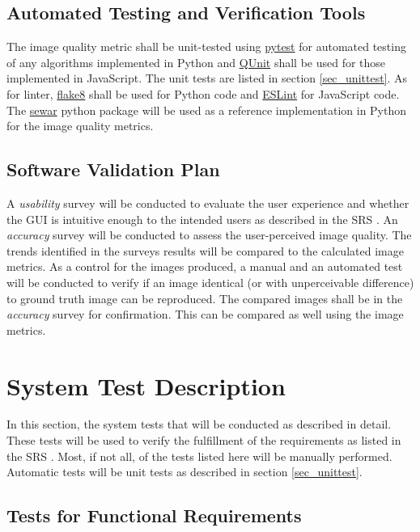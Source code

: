 \documentclass[12pt, titlepage]{article}
\begin{document}
\subsection{Automated Testing and Verification Tools} \label{sec_autotest_tools}

The image quality metric shall be unit-tested using \href{https://pytest.org}{pytest} for 
automated testing of any algorithms implemented in Python and \href{https://qunitjs.com}{QUnit} 
shall be used for those implemented in JavaScript. The unit tests are listed in 
section \ref{sec_unittest}.
As for linter, \href{https://flake8.pycqa.org}{flake8} shall be used for Python code 
and \href{https://eslint.org}{ESLint} for JavaScript code.
The \href{https://github.com/andrewekhalel/sewar}{sewar} python package will be 
used as a reference implementation in Python for the image quality metrics.


\subsection{Software Validation Plan}
A \textit{usability} survey will be conducted to evaluate the user experience and whether 
the GUI is intuitive enough to the intended users as described in the SRS \citep{SRS}.
An \textit{accuracy} survey will be conducted to assess the user-perceived image quality. 
The trends identified in the surveys results will be compared to the calculated image metrics.
As a control for the images produced, a manual and an automated test will be conducted to verify if 
an image identical (or with unperceivable difference) to ground truth image can be reproduced.
The compared images shall be in the \textit{accuracy} survey for confirmation. This can be compared
as well using the image metrics. 


\section{System Test Description}

In this section, the system tests that will be conducted as described in detail. These tests
will be used to verify the fulfillment of the requirements as listed in the SRS \citep{SRS}.
Most, if not all, of the tests listed here will be manually performed. Automatic
tests will be unit tests as described in section \ref{sec_unittest}.

\subsection{Tests for Functional Requirements}
\end{document}
